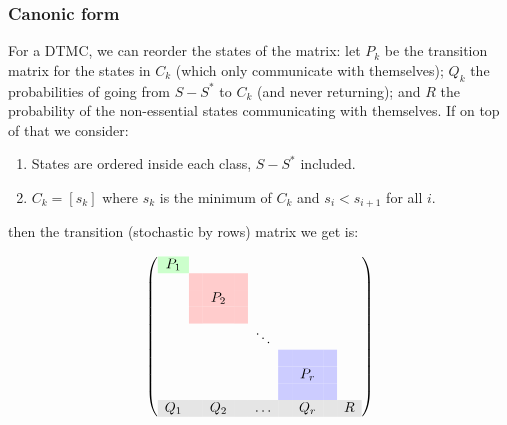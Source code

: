  \begin{frame} \frametitle{Canonic form}
    \vspace{2em}
    For a DTMC, we can reorder the states of the matrix: let $P_k$ be the transition matrix for 
    the states in $C_k$ (which only communicate with themselves); $Q_k$ the probabilities of
    going from $S - S^{\ast}$ to $C_k$ (and never returning); and $R$ the probability
    of the non-essential states communicating with themselves. If on top of that we consider:
    
    \begin{enumerate}
    \item States are ordered inside each class, \(S - S^{\ast}\) included.
    \item \(C_k = [s_k]\) where \(s_k\) is the minimum of \(C_k\) and \(s_{i} < s_{i + 1}\) for all \(i\).
    \end{enumerate}
    
    then the transition (stochastic by rows) matrix we get is:
 
  \[
  \left(\begin{array}{cccccccccc}
  \gcell P_1    &        &            &       &        &       &            &        & \\
                & \rcell & \rcell     & \rcell&        &       &            &        & \\
                & \rcell & \rcell P_2 & \rcell&        &       &            &        & \\
                & \rcell & \rcell     & \rcell&        &       &            &        & \\
                &        &            &       & \ddots &       &            &        & \\
                &        &            &       &        &\bcell &   \bcell   & \bcell & \\
                &        &            &       &        &\bcell & \bcell P_r & \bcell & \\
                &        &            &       &        &\bcell &   \bcell   & \bcell & \\
    \rowcolor{gray!20}
      Q_1       &        &   Q_2      &       & \ldots &       &    Q_r     &        & R\\
  \end{array}\right)
  \]
 \end{frame}

